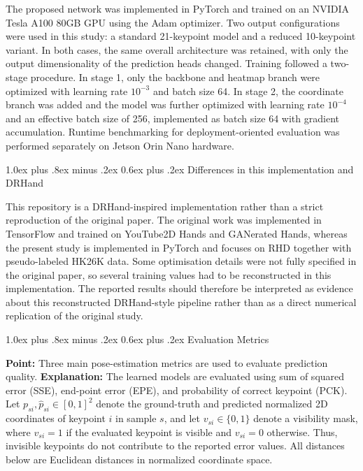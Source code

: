 \documentclass[10pt,letterpaper]{article}
\makeatletter
\renewcommand\subsection{\@startsection{subsection}{2}{\z@}%
  {1.0ex plus .8ex minus .2ex}%
  {0.6ex plus .2ex}%
  {\normalfont\itshape}}
\makeatother
\begin{document}
The proposed network was implemented in PyTorch and trained on an NVIDIA Tesla A100 80GB GPU using the Adam optimizer. Two output configurations were used in this study: a standard 21-keypoint model and a reduced 10-keypoint variant. In both cases, the same overall architecture was retained, with only the output dimensionality of the prediction heads changed. Training followed a two-stage procedure. In stage 1, only the backbone and heatmap branch were optimized with learning rate \(10^{-3}\) and batch size 64. In stage 2, the coordinate branch was added and the model was further optimized with learning rate \(10^{-4}\) and an effective batch size of 256, implemented as batch size 64 with gradient accumulation. Runtime benchmarking for deployment-oriented evaluation was performed separately on Jetson Orin Nano hardware.

\subsection{Differences in this implementation and DRHand}

\noindent This repository is a DRHand-inspired implementation rather than a strict reproduction of the original paper. The original work was implemented in TensorFlow and trained on YouTube2D Hands and GANerated Hands, whereas the present study is implemented in PyTorch and focuses on RHD together with pseudo-labeled HK26K data. Some optimisation details were not fully specified in the original paper, so several training values had to be reconstructed in this implementation. The reported results should therefore be interpreted as evidence about this reconstructed DRHand-style pipeline rather than as a direct numerical replication of the original study.


\subsection{Evaluation Metrics}

\noindent\textbf{Point:} Three main pose-estimation metrics are used to evaluate prediction quality.  
\textbf{Explanation:} The learned models are evaluated using sum of squared error (SSE), end-point error (EPE), and probability of correct keypoint (PCK). Let \(p_{si}, \hat{p}_{si} \in [0,1]^2\) denote the ground-truth and predicted normalized 2D coordinates of keypoint \(i\) in sample \(s\), and let \(v_{si} \in \{0,1\}\) denote a visibility mask, where \(v_{si}=1\) if the evaluated keypoint is visible and \(v_{si}=0\) otherwise. Thus, invisible keypoints do not contribute to the reported error values. All distances below are Euclidean distances in normalized coordinate space.
\end{document}
